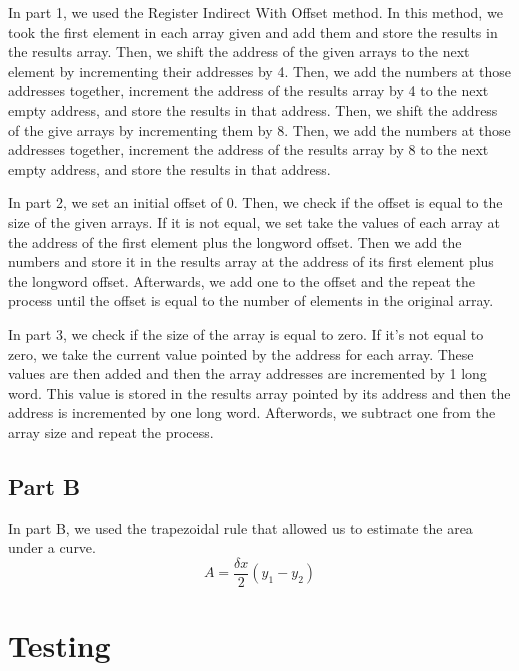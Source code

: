 \documentclass[10pt, letterpaper, titlepage]{article} %
\begin{document}
\begin{multicols*}{2}
In part 1, we used the Register Indirect With Offset method. 
In this method, we took the first element in each array given and add them and store the results in the results array. 
Then, we shift the address of the given arrays to the next element by incrementing their addresses by 4. 
Then, we add the numbers at those addresses together, increment the address of the results array by 4 to the next empty address, and store the results in that address. 
Then, we shift the address of the give arrays by incrementing them by 8. 
Then, we add the numbers at those addresses together, increment the address of the results array by 8 to the next empty address, and store the results in that address.

In part 2, we set an initial offset of 0.
Then, we check if the offset is equal to the size of the given arrays. 
If it is not equal, we set take the values of each array at the address of the first element plus the longword offset. 
Then we add the numbers and store it in the results array at the address of its first element plus the longword offset.
Afterwards, we add one to the offset and the repeat the process until the offset is equal to the number of elements in the original array.

In part 3, we check if the size of the array is equal to zero. 
If it's not equal to zero, we take the current value pointed by the address for each array. 
These values are then added and then the array addresses are incremented by 1 long word. 
This value is stored in the results array pointed by its address and then the address is incremented by one long word.
Afterwords, we subtract one from the array size and repeat the process.

\subsection{Part B}
In part B, we used the trapezoidal rule that allowed us to estimate the area under a curve.\
\begin{equation*}
A = \frac{\delta x}{2} (y_1 - y_2)
\end{equation*}
\section{Testing}

\end{multicols*}
\end{document}
